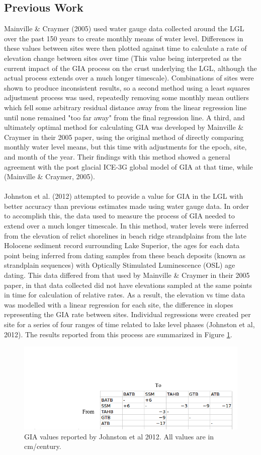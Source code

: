 \subsection{Previous Work} 
Mainville \& Craymer (2005) used water gauge data collected around the LGL over the past 150 years to
 create monthly means of water level. Differences in these values between sites
 were then plotted against time to calculate a rate of elevation change between
 sites over time (This value being interpreted as the current impact of the GIA
 process on the crust underlying the LGL, although the actual process extends
 over a much longer timescale). Combinations of sites were shown to produce
 inconsistent results, so a second method using a least squares adjustment process was used,
 repeatedly removing some monthly mean outliers which fell some arbitrary residual distance away 
 from the linear regression line until none remained "too far away" from
 the final regression line. A third, and ultimately optimal method for calculating
 GIA was developed by
 Mainville \& Craymer in their 2005 paper, using the original
 method of directly comparing monthly
 water level means, but this time with adjustments for the epoch, site, and month of the year.
 Their findings with this method showed a general agreement with the post glacial
 ICE-3G global model of GIA at that time, while (Mainville \& Craymer, 2005).\\ \\
Johnston et al. (2012) attempted to provide a value for GIA in the LGL with
 better accuracy than previous estimates made using water
 gauge data. In order to accomplish this, the data used to measure the process of
 GIA needed to extend over a much longer timescale. In this method, water
 levels were inferred from the elevation of relict shorelines in beach ridge
 strandplains from the late Holocene sediment record surrounding Lake Superior,
 the ages for each data point being inferred from
 dating samples from these beach deposits (known as strandplain sequences) with
 Optically Stimulated Luminescence (OSL) age dating. This data differed from
 that used by Mainville \& Craymer in their 2005 paper, in that data collected did not have
 elevations sampled at the same points in time for calculation of relative
 rates. As a result, the elevation vs time data was modelled with a linear
 regression for each site, the difference in slopes representing the GIA rate
 between sites. Individual regressions were created per site
 for a series of four ranges of time related to lake level phases (Johnston et al, 2012). The results reported from this process
 are summarized in Figure \ref{fig:jj2012Grid}. \\
 
 \begin{figure}[t]
	\includegraphics[width=0.9\linewidth]{jjGrid.png}
	\caption{GIA values reported by Johnston et al 2012. All values are in cm/century.}
	\label{fig:jj2012Grid}
 \end{figure}
 
